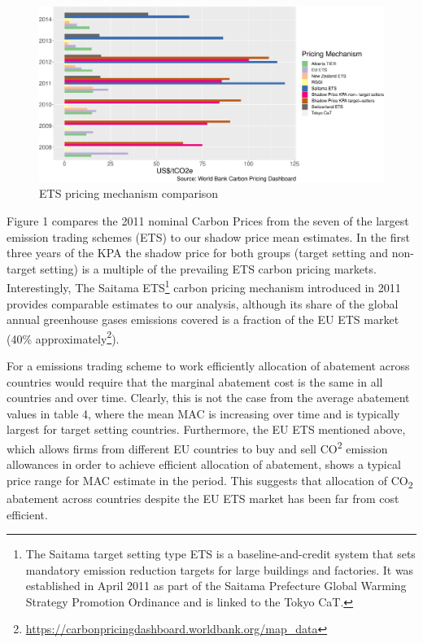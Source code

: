 \documentclass[
  10pt,
]{article}
\begin{document}
\begin{figure}[H]
\includegraphics{figures/paper-ETS comparision-1} \caption{ETS pricing mechanism comparison}\label{fig:ETS comparision}
\end{figure}

Figure 1 compares the 2011 nominal Carbon Prices from the seven of the
largest emission trading schemes (ETS) to our shadow price mean
estimates. In the first three years of the KPA the shadow price for both
groups (target setting and non-target setting) is a multiple of the
prevailing ETS carbon pricing markets. Interestingly, The Saitama
ETS\footnote{The Saitama target setting type ETS is a
  baseline-and-credit system that sets mandatory emission reduction
  targets for large buildings and factories. It was established in April
  2011 as part of the Saitama Prefecture Global Warming Strategy
  Promotion Ordinance and is linked to the Tokyo CaT.} carbon pricing
mechanism introduced in 2011 provides comparable estimates to our
analysis, although its share of the global annual greenhouse gases
emissions covered is a fraction of the EU ETS market (40\%
approximately\footnote{\url{https://carbonpricingdashboard.worldbank.org/map_data}}).

For a emissions trading scheme to work efficiently allocation of
abatement across countries would require that the marginal abatement
cost is the same in all countries and over time. Clearly, this is not
the case from the average abatement values in table 4, where the mean
MAC is increasing over time and is typically largest for target setting
countries. Furthermore, the EU ETS mentioned above, which allows firms
from different EU countries to buy and sell CO\textsuperscript{2}
emission allowances in order to achieve efficient allocation of
abatement, shows a typical price range for MAC estimate in the period.
This suggests that allocation of CO\textsubscript{2} abatement across
countries despite the EU ETS market has been far from cost efficient.
\end{document}
